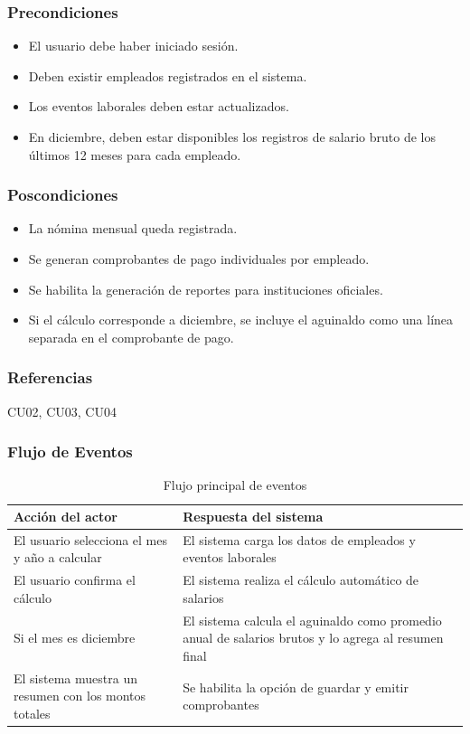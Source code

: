 \subsubsection*{Precondiciones}
\begin{itemize}
	\item El usuario debe haber iniciado sesión.
	\item Deben existir empleados registrados en el sistema.
	\item Los eventos laborales deben estar actualizados.
	\item En diciembre, deben estar disponibles los registros de salario bruto de los últimos 12 meses para cada empleado.
\end{itemize}

\subsubsection*{Poscondiciones}
\begin{itemize}
	\item La nómina mensual queda registrada.
	\item Se generan comprobantes de pago individuales por empleado.
	\item Se habilita la generación de reportes para instituciones oficiales.
	\item Si el cálculo corresponde a diciembre, se incluye el aguinaldo como una línea separada en el comprobante de pago.
\end{itemize}

\subsubsection*{Referencias}
CU02, CU03, CU04

\clearpage

\subsubsection*{Flujo de Eventos}

\begin{table}[h]
	\centering
	\caption{Flujo principal de eventos}
	\begin{tabular}{|p{7cm}|p{7cm}|}
		\hline
		\textbf{Acción del actor}                            & \textbf{Respuesta del sistema}                              \\ \hline
		El usuario selecciona el mes y año a calcular        & El sistema carga los datos de empleados y eventos laborales \\ \hline
		El usuario confirma el cálculo                       & El sistema realiza el cálculo automático de salarios        \\ \hline
		Si el mes es diciembre                               & El sistema calcula el aguinaldo como promedio anual de salarios brutos y lo agrega al resumen final \\ \hline
		El sistema muestra un resumen con los montos totales & Se habilita la opción de guardar y emitir comprobantes      \\ \hline
	\end{tabular}
\end{table}

